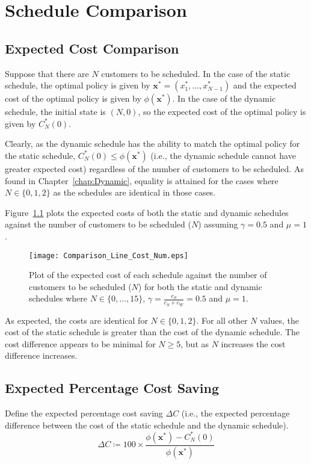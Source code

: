 \chapter{Schedule Comparison}
\section{Expected Cost Comparison}
Suppose that there are $N$ customers to be scheduled. In the case of the static schedule, the optimal policy is given by $\mathbf{x}^{*} = (x_{1}^{*}, \ldots, x_{N - 1}^{*})$ and the expected cost of the optimal policy is given by $\phi (\mathbf{x}^{*})$. In the case of the dynamic schedule, the initial state is $(N, 0)$, so the expected cost of the optimal policy is given by $C_{N}^{*} (0)$.

Clearly, as the dynamic schedule has the ability to match the optimal policy for the static schedule, $C_{N}^{*} (0) \leq \phi (\mathbf{x}^{*})$ (i.e., the dynamic schedule cannot have greater expected cost) regardless of the number of customers to be scheduled. As found in Chapter~\ref{chap:Dynamic}, equality is attained for the cases where $N \in \{ 0, 1, 2 \}$ as the schedules are identical in those cases.

Figure~\ref{Graph_Cost_Comparison} plots the expected costs of both the static and dynamic schedules against the number of customers to be scheduled ($N$) assuming $\gamma = 0.5$ and $\mu = 1$.
\begin{figure}[htb]
	\centering
	\texttt{[image: Comparison\_Line\_Cost\_Num.eps]}
	\caption{Plot of the expected cost of each schedule against the number of customers to be scheduled ($N$) for both the static and dynamic schedules where $N \in \{ 0, \ldots, 15 \}$, $\gamma = \frac{c_{S}}{c_{S} + c_{W}} = 0.5$ and $\mu = 1$.}
	\label{Graph_Cost_Comparison}
\end{figure}

As expected, the costs are identical for $N \in \{ 0, 1, 2 \}$. For all other $N$ values, the cost of the static schedule is greater than the cost of the dynamic schedule. The cost difference appears to be minimal for $N \geq 5$, but as $N$ increases the cost difference increases.

\section{Expected Percentage Cost Saving}
Define the expected percentage cost saving $\Delta C$ (i.e., the expected percentage difference between the cost of the static schedule and the dynamic schedule).
\begin{equation}
	\Delta C \coloneqq 100 \times \frac{\phi (\mathbf{x}^{*}) - C_{N}^{*} (0)}{\phi (\mathbf{x}^{*})}
\end{equation}

